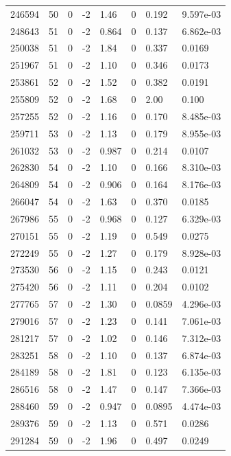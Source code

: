 \documentclass[preview]{standalone}
\begin{document}
{{{{{{{{{{\begin{tabular}{L{1.2cm}C{1.2cm} C{0.3cm}C{0.5cm} C{1.4cm}C{1.4cm} C{1.4cm}C{1.4cm}}
  246594  &    50  & 0     & -2 &  1.46  & 0  & 0.192 &  9.597e-03   \\ 
  248643  &    51  & 0     & -2 &  0.864  & 0  & 0.137 &  6.862e-03   \\ 
  250038  &    51  & 0     & -2 &  1.84  & 0  & 0.337 &  0.0169   \\ 
  251967  &    51  & 0     & -2 &  1.10  & 0  & 0.346 &  0.0173   \\ 
  253861  &    52  & 0     & -2 &  1.52  & 0  & 0.382 &  0.0191   \\ 
  255809  &    52  & 0     & -2 &  1.68  & 0  & 2.00 &  0.100   \\ 
  257255  &    52  & 0     & -2 &  1.16  & 0  & 0.170 &  8.485e-03   \\ 
  259711  &    53  & 0     & -2 &  1.13  & 0  & 0.179 &  8.955e-03   \\ 
  261032  &    53  & 0     & -2 &  0.987  & 0  & 0.214 &  0.0107   \\ 
  262830  &    54  & 0     & -2 &  1.10  & 0  & 0.166 &  8.310e-03   \\ 
  264809  &    54  & 0     & -2 &  0.906  & 0  & 0.164 &  8.176e-03   \\ 
  266047  &    54  & 0     & -2 &  1.63  & 0  & 0.370 &  0.0185   \\ 
  267986  &    55  & 0     & -2 &  0.968  & 0  & 0.127 &  6.329e-03   \\ 
  270151  &    55  & 0     & -2 &  1.19  & 0  & 0.549 &  0.0275   \\ 
  272249  &    55  & 0     & -2 &  1.27  & 0  & 0.179 &  8.928e-03   \\ 
  273530  &    56  & 0     & -2 &  1.15  & 0  & 0.243 &  0.0121   \\ 
  275420  &    56  & 0     & -2 &  1.11  & 0  & 0.204 &  0.0102   \\ 
  277765  &    57  & 0     & -2 &  1.30  & 0  & 0.0859 &  4.296e-03   \\ 
  279016  &    57  & 0     & -2 &  1.23  & 0  & 0.141 &  7.061e-03   \\ 
  281217  &    57  & 0     & -2 &  1.02  & 0  & 0.146 &  7.312e-03   \\ 
  283251  &    58  & 0     & -2 &  1.10  & 0  & 0.137 &  6.874e-03   \\ 
  284189  &    58  & 0     & -2 &  1.81  & 0  & 0.123 &  6.135e-03   \\ 
  286516  &    58  & 0     & -2 &  1.47  & 0  & 0.147 &  7.366e-03   \\ 
  288460  &    59  & 0     & -2 &  0.947  & 0  & 0.0895 &  4.474e-03   \\ 
  289376  &    59  & 0     & -2 &  1.13  & 0  & 0.571 &  0.0286   \\ 
  291284  &    59  & 0     & -2 &  1.96  & 0  & 0.497 &  0.0249   \\ 
\hline 
\end{tabular} 

}}}}}}}}}}
\end{document}
